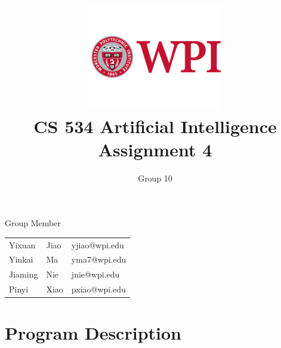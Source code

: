 \documentclass[11pt, a4paper]{article}
\title{\includegraphics[width=0.45\textwidth]{wpi2}
	\\CS 534 Artificial Intelligence \\ Assignment 4 }          %
\author{Group 10 }                    %
\begin{document}
	\begin{titlepage}
		
		\maketitle
		
		\begin{center}
			Group Member
		\end{center}
		
		\begin{table}[htbp] 
			\begin{center}
				\begin{tabular}{l l l} 
					
					Yixuan & Jiao  &   yjiao@wpi.edu \\
					Yinkai & Ma  &   yma7@wpi.edu \\
					Jiaming & Nie  &  jnie@wpi.edu \\
					Pinyi & Xiao  &  pxiao@wpi.edu \\
				\end{tabular}
			\end{center}
		\end{table}
		
		
		
		\thispagestyle{empty}  %
		
	\end{titlepage}





\tableofcontents



\newpage






  
% 

\section{Program Description}
\end{document}
